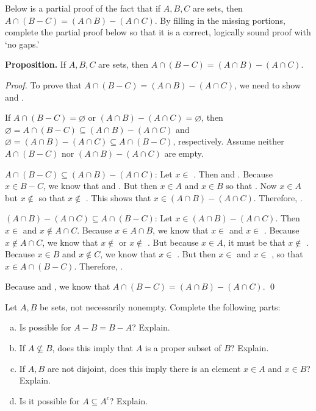 \documentclass[11pt,letterpaper]{article}
\newcommand{\blank}[1]{\underline{\hspace{#1}}} %
\begin{document}
\newpage



 Below is a partial proof of the fact that if $A, B, C$ are sets, then $A \cap (B - C)= (A \cap B) - (A \cap C)$. By filling in the missing portions, complete the partial proof below so that it is a correct, logically sound proof with `no gaps.' \pspace

\noindent \textbf{Proposition.} If $A, B, C$ are sets, then $A \cap (B - C)= (A \cap B) - (A \cap C)$. \pspace

\textit{Proof.} To prove that $A \cap (B - C)= (A \cap B) - (A \cap C)$, we need to show \blank{3cm} and \pspace \blank{3cm}. 

If $A \cap (B - C)= \varnothing$ or $(A \cap B) - (A \cap C)= \varnothing$, then $\varnothing= A \cap (B - C) \subseteq (A \cap B) - (A \cap C)$ and $\varnothing= (A \cap B) - (A \cap C) \subseteq A \cap (B - C)$, respectively. Assume neither $A \cap (B - C)$ nor $(A \cap B) - (A \cap C)$ are empty. 

$A \cap (B - C) \subseteq (A \cap B) - (A \cap C)$: Let $x \in $ \blank{3cm}. Then \blank{3cm} and \pspace \blank{3cm}. Because $x \in B - C$, we know that \blank{3cm} and \blank{3cm}. \pspace But then $x \in A$ and $x \in B$ so that \blank{3cm}. Now $x \in A$ but $x \notin$ \blank{3cm} so that \pspace $x \notin$ \blank{3cm}. This shows that $x \in (A \cap B) - (A \cap C)$. Therefore, \blank{3cm}. 

$(A \cap B) - (A \cap C) \subseteq A \cap (B - C)$: Let $x \in (A \cap B) - (A \cap C)$. Then $x \in$ \blank{3cm} \pspace and $x \notin A \cap C$. Because $x \in A \cap B$, we know that $x \in$ \blank{3cm} and $x \in$ \blank{3cm}. \pspace Because $x \notin A \cap C$, we know that $x \notin$ \blank{3cm} or $x \notin$ \blank{3cm}. But because \pspace $x \in A$, it must be that $x \notin$ \blank{3cm}. Because $x \in B$ and $x \notin C$, we know that \pspace $x \in$ \blank{3cm}. But then $x \in$ \blank{3cm}  and $x \in$ \blank{3cm}, so that \pspace $x \in A \cap (B - C)$. Therefore, \blank{3cm}. 

Because \blank{3cm} and \blank{3cm}, we know that $A \cap (B - C)= (A \cap B) - (A \cap C)$. \qed



\newpage



 Let $A, B$ be sets, not necessarily nonempty. Complete the following parts:
	\begin{enumerate}[(a)]
	\item Is possible for $A - B= B - A$? Explain. 
	\item If $A \not\subseteq B$, does this imply that $A$ is a proper subset of $B$? Explain. 
	\item If $A, B$ are not disjoint, does this imply there is an element $x \in A$ and $x \in B$? Explain.
	\item Is it possible for $A \subseteq A^c$? Explain. 
	\end{enumerate}
\end{document}
